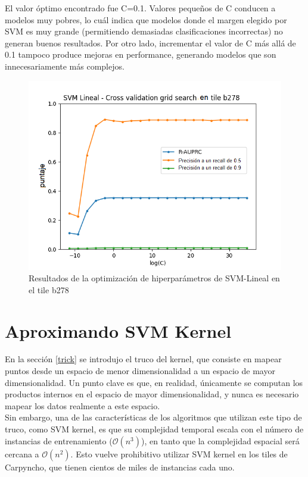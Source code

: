 El valor óptimo encontrado fue C=0.1. Valores pequeños de C conducen a modelos muy pobres, lo cuál indica que modelos donde el margen elegido por SVM es muy grande (permitiendo demasiadas clasificaciones incorrectas) no generan buenos resultados. Por otro lado, incrementar el valor de C más allá de 0.1 tampoco produce mejoras en performance, generando modelos que son innecesariamente más complejos.


\begin{figure}[h!]
\begin{center}
  \includegraphics[width=.6\textwidth]{Kap3/Figure_1.png}
  \end{center}
  \caption{Resultados de la optimización de hiperparámetros de SVM-Lineal en el tile b278}
  \label{fig:optimisationsvml}
\end{figure}


\section{Aproximando SVM Kernel}
En la sección \ref{trick} se introdujo el truco del kernel, que consiste en mapear puntos desde un espacio de menor dimensionalidad a un espacio de mayor dimensionalidad. Un punto clave es que, en realidad, únicamente se computan los productos internos en el espacio de mayor dimensionalidad, y nunca es necesario mapear los datos realmente a este espacio. \\

Sin embargo, una de las características de los algoritmos que utilizan este tipo de truco, como SVM kernel, es que su complejidad temporal escala con el número de instancias de entrenamiento ($\mathcal{O}(n^3)$), en tanto que la complejidad espacial será cercana a $\mathcal{O}(n^2)$. Esto vuelve prohibitivo utilizar SVM kernel en los tiles de Carpyncho, que tienen cientos de miles de instancias cada uno. \\

